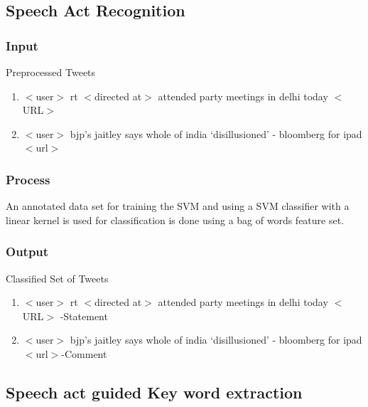 \documentclass[conference]{IEEEtran}
\begin{document}
\subsection{\textbf{Speech Act Recognition}}
\subsubsection{\textbf{Input}}
Preprocessed Tweets
\begin{enumerate}
\item{$<$user$>$ rt $<$directed at$>$ attended party meetings in delhi today $<$URL$>$ }
\item{$<$user$>$ bjp's jaitley says whole of india `disillusioned' - bloomberg for ipad $<$url$>$}
\end{enumerate}
\subsubsection{\textbf{Process}}
\par An annotated data set for training the SVM and using a SVM classifier with a linear kernel is used for classification is done using a bag of words feature set.

\subsubsection{\textbf{Output}}
Classified Set of Tweets
\begin{enumerate}
\item{$<$user$>$ rt $<$directed at$>$ attended party meetings in delhi today $<$URL$>$ -Statement}
\item{$<$user$>$ bjp's jaitley says whole of india `disillusioned' - bloomberg for ipad $<$url$>$-Comment}
\end{enumerate}

\subsection{\textbf{Speech act guided Key word extraction}}
\end{document}
